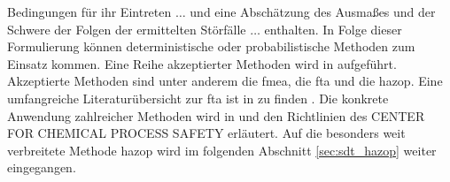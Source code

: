 Bedingungen für ihr Eintreten $\dots$ und eine \glqq Absch\"atzung des Ausma\ss{}es und der Schwere der Folgen der ermittelten St\"orf\"alle $\dots$ enthalten. In Folge dieser Formulierung k\"onnen deterministische oder probabilistische Methoden zum Einsatz kommen. Eine Reihe akzeptierter Methoden wird in  \cite[S. 20 f.]{2009_bimschv12Hilfe} aufgef\"uhrt. Akzeptierte Methoden sind unter anderem die \ac{fmea}, die \ac{fta} und die \ac{hazop}. Eine umfangreiche Literatur\"ubersicht zur \ac{fta} ist in \cite{Baig_2013} zu finden \cite{Baig_2013}. Die konkrete Anwendung zahlreicher Methoden wird in  \cite{Nolan_2014} und den Richtlinien des \MakeUppercase{Center for Chemical Process Safety} \cite{ChemicalProcessSafety_2007, ChemicalProcessSafety_2007a, ChemicalProcessSafety_2008, ChemicalProcessSafety_2008a, ChemicalProcessSafety_2008b,ChemicalProcessSafety_2009, ChemicalProcessSafety_2009a, ChemicalProcessSafety_2010, ChemicalProcessSafety_2012, ChemicalProcessSafety_2013, ChemicalProcessSafety_2015} erl\"autert. Auf die besonders weit verbreitete Methode \ac{hazop} wird im folgenden Abschnitt \ref{sec:sdt_hazop} weiter eingegangen. 

